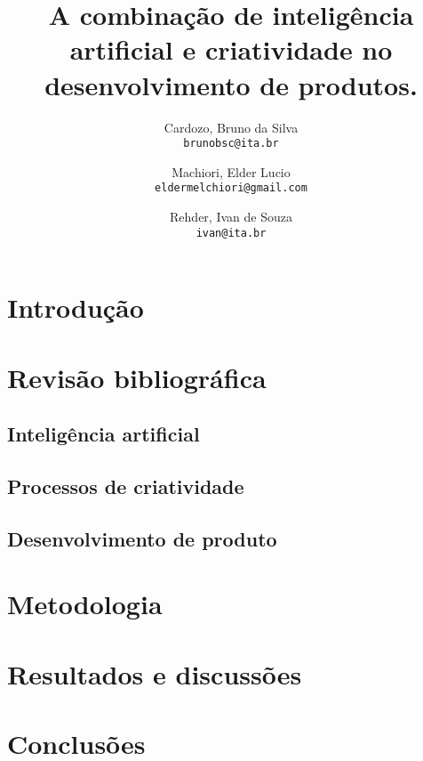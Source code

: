 \documentclass[a4paper, 10pt, dvipsnames]{article}
\title{A combinação de inteligência artificial e criatividade no desenvolvimento de produtos.}
\author{
  Cardozo, Bruno da Silva\\
  \texttt{brunobsc@ita.br}
  \and
  Machiori, Elder Lucio\\
  \texttt{eldermelchiori@gmail.com}
  \and
  Rehder, Ivan de Souza\\
  \texttt{ivan@ita.br}
}
\begin{document}
\maketitle

\begin{abstract}

\end{abstract}

\section{Introdução}


\section{Revisão bibliográfica}

\subsection{Inteligência artificial}


\subsection{Processos de criatividade}


\subsection{Desenvolvimento de produto}


\section{Metodologia}


\section{Resultados e discussões}


\section{Conclusões}


%

\end{document}
